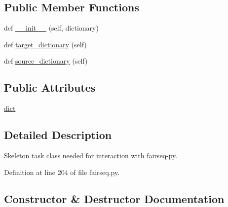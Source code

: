 \subsection*{Public Member Functions}
\begin{DoxyCompactItemize}
\item 
def \hyperlink{classparlai_1_1agents_1_1fairseq_1_1fairseq_1_1__ParlaiTask_abced2b4749e8ea8b43fef0db630495ed}{\+\_\+\+\_\+init\+\_\+\+\_\+} (self, dictionary)
\item 
def \hyperlink{classparlai_1_1agents_1_1fairseq_1_1fairseq_1_1__ParlaiTask_a8579ce39f8cf336285d14ae06d23cf11}{target\+\_\+dictionary} (self)
\item 
def \hyperlink{classparlai_1_1agents_1_1fairseq_1_1fairseq_1_1__ParlaiTask_a9aee75f625a939d43f7dfd9842e8e345}{source\+\_\+dictionary} (self)
\end{DoxyCompactItemize}
\subsection*{Public Attributes}
\begin{DoxyCompactItemize}
\item 
\hyperlink{classparlai_1_1agents_1_1fairseq_1_1fairseq_1_1__ParlaiTask_ac8df07e62c32b898201ed923270c4ec4}{dict}
\end{DoxyCompactItemize}


\subsection{Detailed Description}
\begin{DoxyVerb}Skeleton task class needed for interaction with fairseq-py.\end{DoxyVerb}
 

Definition at line 204 of file fairseq.\+py.



\subsection{Constructor \& Destructor Documentation}
\mbox{\label{classparlai_1_1agents_1_1fairseq_1_1fairseq_1_1__ParlaiTask_abced2b4749e8ea8b43fef0db630495ed}} 

